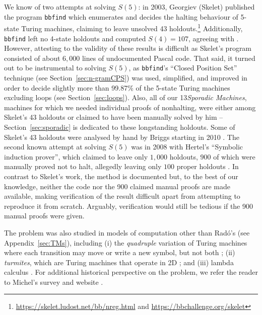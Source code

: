 \documentclass[letterpaper,british,11pt]{article}
\theoremstyle{definition} %
\numberwithin{equation}{section}
\theoremstyle{definition} %
\newcommand{\ts}[1]{{\color{red}#1}}
\newcommand{\rado}{Rad\'o\xspace}
\newcommand{\numSporadic}{13\xspace}
\begin{document}
\newcommand{\SkeletHoldoutsSporadic}{\ts{XX}\xspace}

We know of two attempts at solving $S(5)$: in 2003, Georgiev (Skelet) published the program \texttt{bbfind} \cite{Skelet_bbfind} which enumerates and decides the halting behaviour of 5-state Turing machines, claiming to leave unsolved 43 holdouts.\footnote{\url{https://skelet.ludost.net/bb/nreg.html} and \url{https://bbchallenge.org/skelet}} Additionally, \texttt{bbfind} left no 4-state holdouts and computed $S(4) = 107$, agreeing with \cite{Brady83}. However, attesting to the validity of these results is difficult as Skelet's program consisted of about $6{,}000$ lines of undocumented Pascal code. That said, it turned out to be instrumental to solving $S(5)$, as \texttt{bbfind}'s ``Closed Position Set'' technique (see Section~\ref{sec:n-gramCPS}) was used, simplified, and improved in order to decide slightly more than 99.87\% of the 5-state Turing machines excluding loops (see Section~\ref{sec:loops}). Also, all of our \numSporadic \textit{Sporadic Machines}, \ie machines for which we needed individual proofs of nonhalting, were either among Skelet's 43 holdouts or claimed to have been manually solved by him -- Section~\ref{sec:sporadic} is dedicated to these longstanding holdouts. Some of Skelet's 43 holdouts were analysed by hand by Briggs starting in 2010 \cite{DanBriggs}. The second known attempt at solving $S(5)$ was in 2008 with Hertel's ``Symbolic induction prover'', which claimed to leave only $1{,}000$ holdouts, $900$ of which were manually proved not to halt, allegedly leaving only $100$ proper holdouts \cite{Hertel}. In contrast to Skelet's work, the method is documented but, to the best of our knowledge, neither the code nor the 900 claimed manual proofs are made available, making verification of the result difficult apart from attempting to reproduce it from scratch. Arguably, verification would still be tedious if the 900 manual proofs were given.

The \BBfull problem was also studied in models of computation other than \rado's (see Appendix~\ref{sec:TMs}), including (i) the \textit{quadruple} variation of Turing machines where each transition may move or write a new symbol, but not both \cite{Ross2003,Ross2005}; (ii) \textit{turmites}, which are Turing machines that operate in 2D \cite{BradyMeaningOfLife}; and (iii) lambda calculus \cite{tromp_oeis}. For additional historical perspective on the \BBfull problem, we refer the reader to Michel's survey and website \cite{michel2019busy,PMichel_website}.
\end{document}
